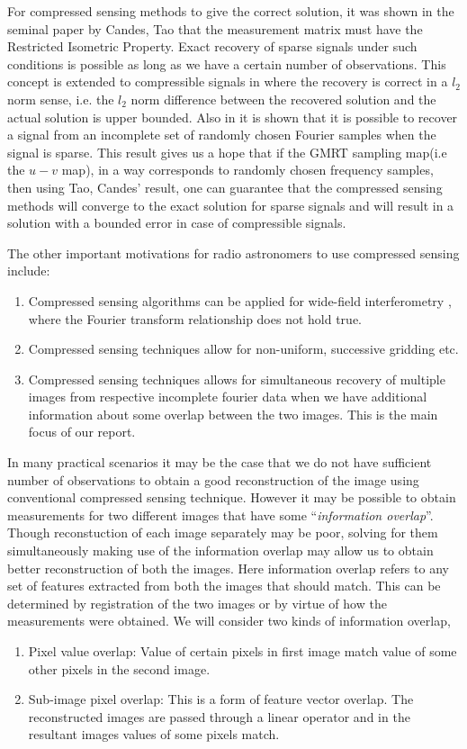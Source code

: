 For compressed sensing methods to give the correct solution, it was shown in  the seminal paper by Candes, Tao \cite{Tao} that the measurement matrix
must have the Restricted Isometric Property. Exact recovery of sparse signals under such conditions is possible as long as we have a certain number of observations. This concept is extended to compressible signals in \cite{romberg} where the recovery is correct in a $l_2$ norm sense, i.e. the $l_2$ norm difference between the recovered solution and the actual solution is upper bounded. Also in \cite{Tao} it is shown that it is possible to recover a signal from an incomplete set of randomly chosen Fourier samples when the signal is sparse.
This result gives us a hope that if the GMRT sampling map(i.e the $u-v$ map), in a way corresponds to randomly chosen frequency samples, 
then using Tao, Candes' result, one can guarantee that the compressed sensing methods will converge to the exact solution for sparse signals and will result in a solution with a bounded error in case of compressible signals.

The other important motivations for radio astronomers to use compressed sensing include:
\begin{enumerate}
 \item Compressed sensing algorithms can be applied for wide-field interferometry \cite{wide_field}, where the Fourier transform relationship does not
 hold true.
 \item Compressed sensing techniques allow for non-uniform, successive gridding etc.\cite{ncra_book}
 \item Compressed sensing techniques allows for simultaneous recovery of multiple images from respective incomplete fourier data when we have additional information about some overlap between the two images. This is the main focus of our report.
\end{enumerate}

In many practical scenarios it may be the case that we do not have sufficient number of observations to obtain a good reconstruction of  the image using conventional compressed sensing technique. However it may be possible to obtain measurements for two different images that have some ``\emph{information overlap}''. Though reconstuction of each image separately may be poor, solving for them simultaneously making use of the information overlap may allow us to obtain better reconstruction of both the images. Here information overlap refers to any set of features extracted from both the images that should match. This can be determined by registration of the two images or by virtue of how the measurements were obtained.  We will consider two kinds of information overlap,
\begin{enumerate}
 \item Pixel value overlap: Value of certain pixels in first image match value of some other pixels in the second image. 
 \item Sub-image pixel overlap: This is a form of feature vector overlap. The reconstructed images are passed through a linear operator and in the resultant images values of some pixels match.
\end{enumerate}

